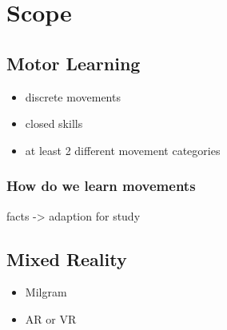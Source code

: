 \chapter{Scope}
\section{Motor Learning}
\begin{itemize}
	\item discrete movements
	\item closed skills
	\item at least 2 different movement categories 
\end{itemize}
\subsection{How do we learn movements}
facts -> adaption for study
\section{Mixed Reality}
\begin{itemize}
	\item Milgram
	\item AR or VR
\end{itemize}
